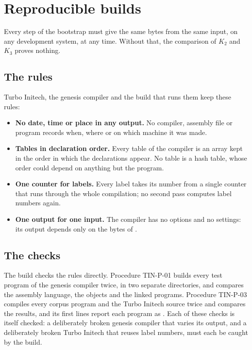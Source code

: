 \chapter{Reproducible builds}

Every step of the bootstrap must give the same bytes from the same input,
on any development system, at any time.  Without that, the comparison of
$K_2$ and $K_3$ proves nothing.

\section{The rules}
Turbo Initech, the genesis compiler and the build that runs them keep these
rules:

\begin{itemize}
\item \textbf{No date, time or place in any output.}  No compiler, assembly
  file or program records when, where or on which machine it was made.
\item \textbf{Tables in declaration order.}  Every table of the compiler is
  an array kept in the order in which the declarations appear.  No table is
  a hash table, whose order could depend on anything but the program.
\item \textbf{One counter for labels.}  Every label takes its number from a
  single counter that runs through the whole compilation; no second pass
  computes label numbers again.
\item \textbf{One output for one input.}  The compiler has no options and
  no settings: its output depends only on the bytes of .
\end{itemize}

\section{The checks}
The build checks the rules directly.  Procedure TIN-P-01 builds every test
program of the genesis compiler twice, in two separate directories, and
compares the assembly language, the objects and the linked programs.
Procedure TIN-P-03 compiles every corpus program and the Turbo Initech
source twice and compares the results, and its first lines report each
program as .  Each of these checks is itself checked:
a deliberately broken genesis compiler that varies its output, and a
deliberately broken Turbo Initech that reuses label numbers, must each be
caught by the build.

